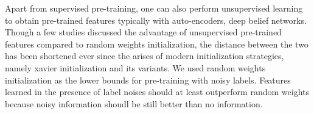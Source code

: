 

Apart from supervised pre-training, one can also perform unsupervised learning to obtain pre-trained features typically with auto-encoders\cite{vincent2010stacked,masci2011stacked}, deep belief networks\cite{hinton2006fast,lee2009convolutional}.
Though a few studies\cite{erhan2009difficulty,erhan2010does,bengio2012deep} discussed the advantage of unsupervised pre-trained features compared to random weights initialization, the distance between the two has been shortened ever since the arises of modern initialization strategies, namely xavier initialization\cite{glorot2010understanding} and its variants.
We used random weights initialization as the lower bounds for pre-training with noisy labels.
Features learned in the presence of label noises should at least outperform random weights because noisy information shoudl be still better than no information.

